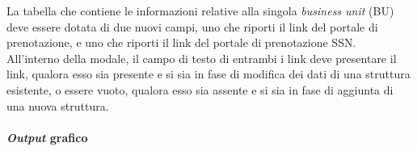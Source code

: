 La tabella che contiene le informazioni relative alla singola \textit{business unit} (BU) deve essere dotata di due nuovi campi, uno che riporti il link del portale di prenotazione, e uno che riporti il link del portale di prenotazione SSN.\\
All'interno della modale, il campo di testo di entrambi i link deve presentare il link, qualora esso sia presente e si sia in fase di modifica dei dati di una struttura esistente, o essere vuoto, qualora esso sia assente e si sia in fase di aggiunta di una nuova struttura.

\newpage\paragraph{\textit{Output} grafico}




